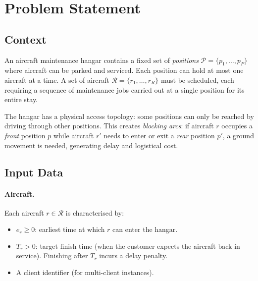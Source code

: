 \section{Problem Statement}

\subsection{Context}

An aircraft maintenance hangar contains a fixed set of \emph{positions}
$\mathcal{P} = \{p_1, \ldots, p_P\}$ where aircraft can be parked and serviced.
Each position can hold at most one aircraft at a time.
A set of aircraft $\mathcal{R} = \{r_1, \ldots, r_R\}$ must be scheduled, each
requiring a sequence of maintenance jobs carried out at a single position for its
entire stay.

The hangar has a physical access topology: some positions can only be reached by
driving through other positions.  This creates \emph{blocking arcs}: if aircraft
$r$ occupies a \emph{front} position $p$ while aircraft $r'$ needs to enter or
exit a \emph{rear} position $p'$, a ground movement is needed, generating delay
and logistical cost.

\subsection{Input Data}

\paragraph{Aircraft.}
Each aircraft $r \in \mathcal{R}$ is characterised by:
\begin{itemize}[noitemsep]
    \item $e_r \geq 0$: earliest time at which $r$ can enter the hangar.
    \item $T_r > 0$: target finish time (when the customer expects the aircraft
          back in service).  Finishing after $T_r$ incurs a delay penalty.
    \item A client identifier (for multi-client instances).
\end{itemize}

